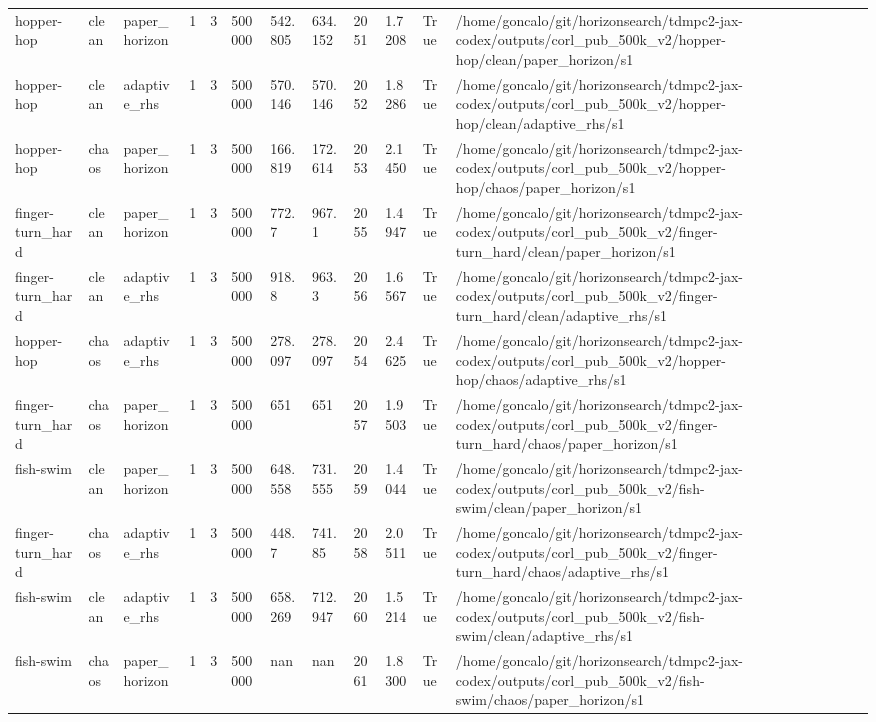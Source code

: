 \begin{tabular}{llllllllllll}
hopper-hop & clean & paper\_horizon & 1 & 3 & 500000 & 542.805 & 634.152 & 2051 & 1.7208 & True & /home/goncalo/git/horizonsearch/tdmpc2-jax-codex/outputs/corl\_pub\_500k\_v2/hopper-hop/clean/paper\_horizon/s1 \\
hopper-hop & clean & adaptive\_rhs & 1 & 3 & 500000 & 570.146 & 570.146 & 2052 & 1.8286 & True & /home/goncalo/git/horizonsearch/tdmpc2-jax-codex/outputs/corl\_pub\_500k\_v2/hopper-hop/clean/adaptive\_rhs/s1 \\
hopper-hop & chaos & paper\_horizon & 1 & 3 & 500000 & 166.819 & 172.614 & 2053 & 2.1450 & True & /home/goncalo/git/horizonsearch/tdmpc2-jax-codex/outputs/corl\_pub\_500k\_v2/hopper-hop/chaos/paper\_horizon/s1 \\
finger-turn\_hard & clean & paper\_horizon & 1 & 3 & 500000 & 772.7 & 967.1 & 2055 & 1.4947 & True & /home/goncalo/git/horizonsearch/tdmpc2-jax-codex/outputs/corl\_pub\_500k\_v2/finger-turn\_hard/clean/paper\_horizon/s1 \\
finger-turn\_hard & clean & adaptive\_rhs & 1 & 3 & 500000 & 918.8 & 963.3 & 2056 & 1.6567 & True & /home/goncalo/git/horizonsearch/tdmpc2-jax-codex/outputs/corl\_pub\_500k\_v2/finger-turn\_hard/clean/adaptive\_rhs/s1 \\
hopper-hop & chaos & adaptive\_rhs & 1 & 3 & 500000 & 278.097 & 278.097 & 2054 & 2.4625 & True & /home/goncalo/git/horizonsearch/tdmpc2-jax-codex/outputs/corl\_pub\_500k\_v2/hopper-hop/chaos/adaptive\_rhs/s1 \\
finger-turn\_hard & chaos & paper\_horizon & 1 & 3 & 500000 & 651 & 651 & 2057 & 1.9503 & True & /home/goncalo/git/horizonsearch/tdmpc2-jax-codex/outputs/corl\_pub\_500k\_v2/finger-turn\_hard/chaos/paper\_horizon/s1 \\
fish-swim & clean & paper\_horizon & 1 & 3 & 500000 & 648.558 & 731.555 & 2059 & 1.4044 & True & /home/goncalo/git/horizonsearch/tdmpc2-jax-codex/outputs/corl\_pub\_500k\_v2/fish-swim/clean/paper\_horizon/s1 \\
finger-turn\_hard & chaos & adaptive\_rhs & 1 & 3 & 500000 & 448.7 & 741.85 & 2058 & 2.0511 & True & /home/goncalo/git/horizonsearch/tdmpc2-jax-codex/outputs/corl\_pub\_500k\_v2/finger-turn\_hard/chaos/adaptive\_rhs/s1 \\
fish-swim & clean & adaptive\_rhs & 1 & 3 & 500000 & 658.269 & 712.947 & 2060 & 1.5214 & True & /home/goncalo/git/horizonsearch/tdmpc2-jax-codex/outputs/corl\_pub\_500k\_v2/fish-swim/clean/adaptive\_rhs/s1 \\
fish-swim & chaos & paper\_horizon & 1 & 3 & 500000 & nan & nan & 2061 & 1.8300 & True & /home/goncalo/git/horizonsearch/tdmpc2-jax-codex/outputs/corl\_pub\_500k\_v2/fish-swim/chaos/paper\_horizon/s1 \\

\end{tabular}
